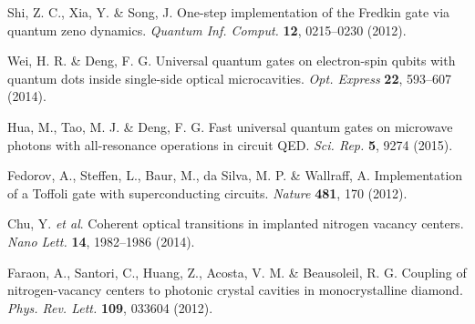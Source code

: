 \documentclass[showpacs,preprintnumbers,showkeys,amsmath,amssymb]{revtex4}%
\begin{document}
\begin{thebibliography}{61}
 Shi, Z. C., Xia, Y. \&  Song,  J. One-step implementation of the Fredkin gate via quantum zeno dynamics. \emph{Quantum Inf. Comput.} \textbf{12}, 0215--0230 (2012).

 Wei, H. R. \& Deng, F. G. Universal quantum gates on electron-spin qubits with quantum dots inside single-side optical microcavities. \emph{Opt. Express} \textbf{22}, 593--607 (2014).

 Hua, M., Tao, M. J. \& Deng, F. G. Fast universal quantum gates on microwave photons with all-resonance operations in circuit QED. \emph{Sci. Rep.} \textbf{5}, 9274 (2015).

 Fedorov, A., Steffen, L., Baur, M., da Silva, M. P. \& Wallraff, A. Implementation of a Toffoli gate with superconducting circuits. \emph{Nature} \textbf{481}, 170 (2012).





 Chu, Y. \emph{et al}.  Coherent optical transitions in implanted nitrogen vacancy centers. \emph{Nano Lett.} \textbf{14}, 1982--1986 (2014).


 Faraon, A., Santori, C., Huang, Z., Acosta, V. M. \& Beausoleil, R. G. Coupling of nitrogen-vacancy centers to photonic crystal cavities in monocrystalline diamond. \emph{Phys. Rev. Lett.} \textbf{109}, 033604 (2012).






\end{thebibliography}
\end{document}
